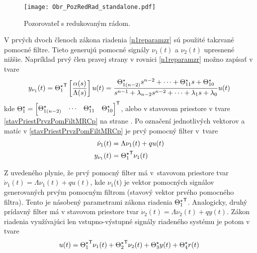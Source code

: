 \documentclass[a4paper, 10pt, ]{article}
\begin{document}
\begin{figure}[t]
    \centering
    \texttt{[image: Obr\_PozRedRad\_standalone.pdf]}
    \caption{Pozorovateľ s redukovaným rádom.}
    \label{Obr_PozRedRad}
\end{figure}











V prvých dvoch členoch zákona riadenia \eqref{n1reparamzr} sú použité takzvané pomocné filtre. Tieto generujú pomocné signály $\nu_1(t)$ a $\nu_2(t)$ upresnené nižšie. Napríklad prvý člen pravej strany v rovnici \eqref{n1reparamzr} možno zapísať v tvare
\begin{equation}
	y_{\nu_1}(t) = {\Theta_1^\star}^{\mathsf{T}} \left[\frac{\alpha(s)}{\Lambda(s)}\right] u(t)
	=
	\frac{
	\Theta_{1(n-2)}^\star s^{n-2}    + \cdots + \Theta_{11}^\star s + \Theta_{10}^\star
	}{
	s^{n-1}+ \lambda_{n-2} s^{n-2} + \cdots + \lambda_1 s + \lambda_0
	}
	u(t)
\end{equation}
kde $ \Theta_1^\star = \begin{bmatrix} \Theta_{1(n-2)}^\star  & \cdots & \Theta_{11}^\star & \Theta_{10}^\star \end{bmatrix}^{\mathsf{T}} $, alebo v stavovom priestore v tvare \eqref{stavPriestPrvzPomFiltMRCp} na strane \pageref{stavPriestPrvzPomFiltMRCp}. Po označení jednotlivých vektorov a matíc v \eqref{stavPriestPrvzPomFiltMRCp} je prvý pomocný filter v~tvare
\begin{subequations}
	\begin{align}
		\dot \nu_1(t)
		&=
		\Lambda
		\nu_1(t)
		+
		q
		u(t)
		\\
		y_{\nu_1}(t)
		&=
		{\Theta_1^\star}^{\mathsf{T}}
		\nu_1(t)
	\end{align}
\end{subequations}



Z uvedeného plynie, že prvý pomocný filter má v~stavovom priestore tvar $ \dot \nu_1(t) = \Lambda \nu_1(t) + q u(t) $, kde $\nu_1$(t) je vektor pomocných signálov generovaných prvým pomocným filtrom (stavový vektor prvého pomocného filtra). Tento je násobený parametrami zákona riadenia ${\Theta_1^\star}^{\mathsf{T}}$. Analogicky, druhý prídavný filter má v stavovom priestore tvar $ \dot{\nu}_2(t) = \Lambda \nu_2(t) + q y(t) $. Zákon riadenia využívajúci len vstupno-výstupné signály riadeného systému je potom v tvare
\begin{align} \label{zakriadspoz}
	u(t) = {\Theta_1^\star}^{\mathsf{T}} \nu_1(t) + {\Theta_2^\star}^{\mathsf{T}} \nu_2(t) + \Theta_3^\star y(t) + \Theta_4^\star r(t)
\end{align}
\end{document}
